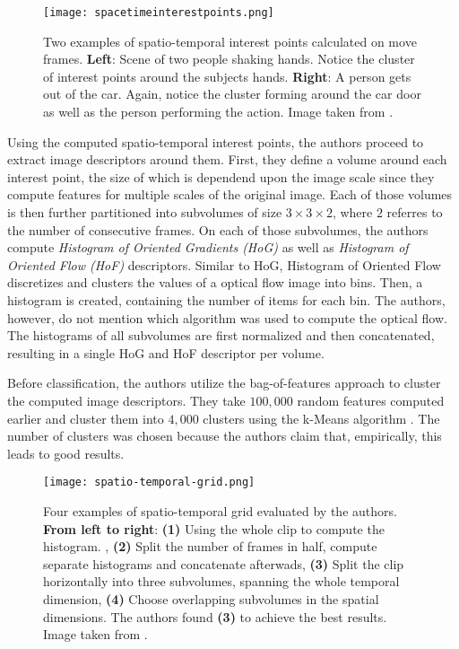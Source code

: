 \begin{figure}[htb!]
    \centering
    \texttt{[image: spacetimeinterestpoints.png]}
    \caption{Two examples of spatio-temporal interest points calculated on move frames. \textbf{Left}: Scene of two people shaking hands. Notice the cluster of interest points around the subjects hands. \textbf{Right}: A person gets out of the car. Again, notice the cluster forming around the car door as well as the person performing the action. Image taken from \cite{laptev_learning_2008}. }
    \label{fig:spatio-temporal-interestpoints}
\end{figure}

Using the computed spatio-temporal interest points, the authors proceed to extract image descriptors around them.
First, they define a volume around each interest point, the size of which is dependend upon the image scale since they compute features for multiple scales of the original image.
Each of those volumes is then further partitioned into subvolumes of size $3 \times 3 \times 2$, where $2$ referres to the number of consecutive frames.
On each of those subvolumes, the authors compute \textit{Histogram of Oriented Gradients (HoG)} as well as \textit{Histogram of Oriented Flow (HoF)} descriptors.
Similar to HoG, Histogram of Oriented Flow discretizes and clusters the values of a optical flow image into bins.
Then, a histogram is created, containing the number of items for each bin.
The authors, however, do not mention which algorithm was used to compute the optical flow.
The histograms of all subvolumes are first normalized and then concatenated, resulting in a single HoG and HoF descriptor per volume.

Before classification, the authors utilize the bag-of-features approach to cluster the computed image descriptors.
They take $100,000$ random features computed earlier and cluster them into $4,000$ clusters using the k-Means algorithm \cite{macqueen_methods_1967}\cite{lloyd_least_1982}.
The number of clusters was chosen because the authors claim that, empirically, this leads to good results.

\begin{figure}[htb!]
    \centering
    \texttt{[image: spatio-temporal-grid.png]}
    \caption{Four examples of spatio-temporal grid evaluated by the authors. \textbf{From left to right}: \textbf{(1)} Using the whole clip to compute the histogram. , \textbf{(2)} Split the number of frames in half, compute separate histograms and concatenate afterwads, \textbf{(3)} Split the clip horizontally into three subvolumes, spanning the whole temporal dimension, \textbf{(4)} Choose overlapping subvolumes in the spatial dimensions. The authors found \textbf{(3)} to achieve the best results. Image taken from \cite{laptev_learning_2008}. }
    \label{fig:spatio-temporal-grid}
\end{figure}

